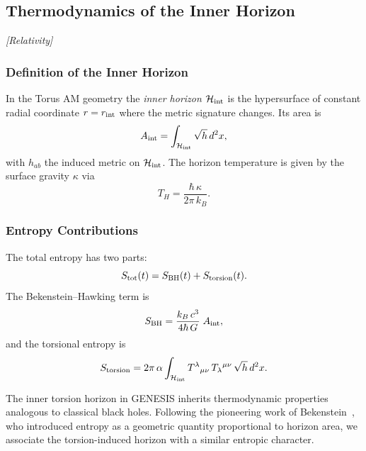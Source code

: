 \documentclass{article}
\newcommand{\grtag}{\textcolor{blue!40!black}{\textit{[Relativity]}}}
\begin{document}
\subsection{Thermodynamics of the Inner Horizon}
\label{subsec:inner_horizon}
\grtag


\subsubsection{Definition of the Inner Horizon}
In the Torus AM geometry the \emph{inner horizon} $\mathcal H_{\rm int}$ is
the hypersurface of constant radial coordinate $r=r_{\rm int}$ where the metric
signature changes.  Its area is
\begin{equation}\label{eq:auto47}
A_{\rm int}
  = \int_{\mathcal H_{\rm int}} \sqrt{h}\,d^2x,
\end{equation}
with $h_{ab}$ the induced metric on $\mathcal H_{\rm int}$.  The horizon
temperature is given by the surface gravity $\kappa$ via
\begin{equation}\label{eq:auto48}
T_H = \frac{\hbar\,\kappa}{2\pi\,k_B}.
\end{equation}

\subsubsection{Entropy Contributions}
The total entropy has two parts:
\begin{equation}\label{eq:auto49}
S_{\rm tot}(t)=S_{\rm BH}(t)+S_{\rm torsion}(t).
\end{equation}
The Bekenstein–Hawking term is
\begin{equation}\label{eq:auto50}
S_{\rm BH}
  = \frac{k_B\,c^3}{4\hbar\,G}\;A_{\rm int},
\end{equation}
and the torsional entropy is
\begin{equation}\label{eq:auto51}
S_{\rm torsion}
  =2\pi\,\alpha
    \int_{\mathcal H_{\rm int}}
      T^{\lambda}{}_{\mu\nu}\,T_{\lambda}{}^{\mu\nu}\,
      \sqrt{h}\,d^2x.
\end{equation}

The inner torsion horizon in GENESIS inherits thermodynamic properties analogous to classical black holes. Following the pioneering work of Bekenstein~\cite{bekenstein1973,bekenstein1974}, who introduced entropy as a geometric quantity proportional to horizon area, we associate the torsion-induced horizon with a similar entropic character.
\end{document}
